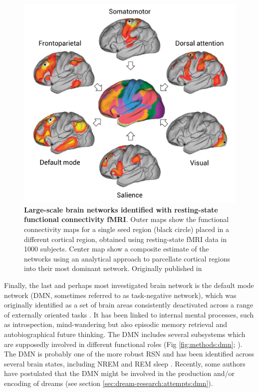 \begin{figure}[htb]
	\includegraphics[width=\textwidth]{Fig/Methods/fMRI_Networks/fMRI_Networks.png}
	\caption[Large-scale brain networks]{\textbf{Large-scale brain networks identified with resting-state functional connectivity fMRI}. Outer maps show the functional connectivity maps for a single seed region (black circle) placed in a different cortical region, obtained using resting-state fMRI data in 1000 subjects. Center map show a composite estimate of the networks using an analytical approach to parcellate cortical regions into their most dominant network. Originally published in \citet{buckner_opportunities_2013}}
	\label{fig:methods:networks}
\end{figure}

Finally, the last and perhaps most investigated brain network is the default mode network (DMN, sometimes referred to as task-negative network), which was originally identified as a set of brain areas consistently deactivated across a range of externally oriented tasks \citep{raichle_default_2001}. It has been linked to internal mental processes, such as introspection, mind-wandering but also episodic memory retrieval and autobiographical future thinking. The DMN includes several subsystems which are supposedly involved in different functional roles  (Fig \ref{fig:methods:dmn}; \citealp{andrews-hanna_functional-anatomic_2010}). The DMN is probably one of the more robust RSN and has been identified across several brain states, including NREM and REM sleep \citep{horovitz_decoupling_2009, larson-prior_cortical_2009, larson-prior_modulation_2011, wu_variations_2012}. Recently, some authors have postulated that the DMN might be involved in the production and/or encoding of dreams (see section \ref{sec:dream-research:attempts:dmn}).

